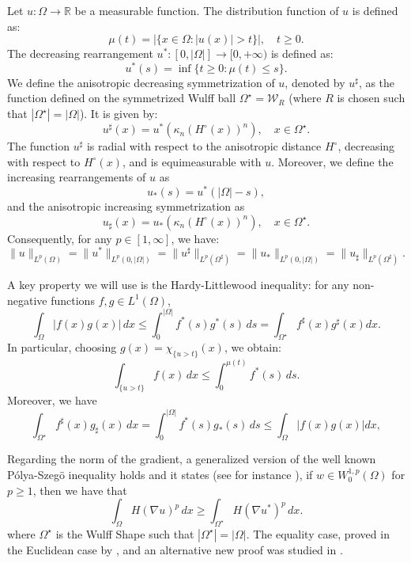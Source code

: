 \documentclass[oneside,a4paper,12pt,notitlepage]{article}
\theoremstyle{definition}
\newcommand{\R}{\mathbb{R}}
\begin{document}
Let $u: \Omega \to \R$ be a measurable function. The distribution function of $u$ is defined as:
\[
    \mu(t) = |\{ x \in \Omega : |u(x)| > t \}|, \quad t \geq 0.
\]
The decreasing rearrangement $u^*: [0, |\Omega|] \to [0, +\infty)$ is defined as:
\[
    u^*(s) = \inf \{ t \geq 0 : \mu(t) \leq s \}.
\]
We define the anisotropic decreasing symmetrization of $u$, denoted by $u^\sharp$, as the function defined on the symmetrized Wulff ball $\Omega^\star = \mathcal{W}_R$ (where $R$ is chosen such that $|\Omega^\star| = |\Omega|$). It is given by:
\begin{equation} \label{eq:ustar_def}
    u^\sharp(x) = u^*(\kappa_n (H^\circ(x))^n), \quad x \in \Omega^\star.
\end{equation}
The function $u^\sharp$ is radial with respect to the anisotropic distance $H^\circ$, decreasing with respect to $H^\circ(x)$, and is equimeasurable with $u$. 
Moreover, we define the increasing rearrangements of $u$ as 
$$u_*(s)=u^*(|\Omega|-s), $$
and the anisotropic increasing symmetrization as 
$$ u_\sharp(x)=u_*(\kappa_n (H^\circ(x))^n), \quad x \in \Omega^\star.$$
Consequently, for any $p \in [1, \infty]$, we have: 
\[
    \|u\|_{L^p(\Omega)} = \|u^*\|_{L^p(0, |\Omega|)} = \|u^\sharp\|_{L^p(\Omega^\sharp)}=\|u_*\|_{L^p(0, |\Omega|)} = \|u_\sharp\|_{L^p(\Omega^\sharp)}.
\]

A key property we will use is the Hardy-Littlewood inequality: for any non-negative functions $f, g \in L^1(\Omega)$,
\[
    \int_\Omega |f(x) g(x)| \, dx \leq \int_0^{|\Omega|} f^*(s) g^*(s) \, ds=\int_{\Omega^\star} f^\sharp(x)g^\sharp(x)dx. 
\]
In particular, choosing $g(x) = \chi_{\{u > t\}}(x)$, we obtain:
\begin{equation} \label{eq:HL_levelsets}
    \int_{\{u > t\}} f(x) \, dx \leq \int_0^{\mu(t)} f^*(s) \, ds.
\end{equation}
Moreover, we have
\[
    \int_{\Omega^\star }f^\sharp(x) g_\sharp(x) \, dx = \int_0^{|\Omega|} f^*(s) g_*(s) \, ds\leq\int_{\Omega} |f(x)g(x)|dx, 
\]

Regarding the norm of the gradient, a generalized version of the  well known P\'olya-Szeg\"o inequality holds and it states (see for instance \cite{AFTL97}), if $w \in W^{1,p}_0(\Omega)$ for $p\ge 1$, then we have that
\begin{equation*}
    \int_{\Omega}H(\nabla u)^p\,dx \ge \int_{\Omega^{\star}} H(\nabla u^{*})^p\,dx.
\end{equation*}
where $\Omega^\star$ is the Wulff Shape such that $|\Omega^\star|=|\Omega|$.
The equality case, proved in the Euclidean case by \cite{Brothers1988}, and an alternative new proof was studied in \cite{ferone2003minimal}.
\end{document}
